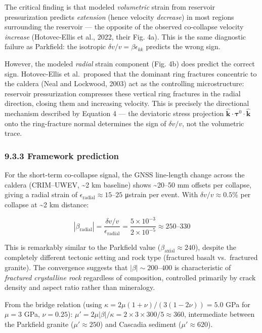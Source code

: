 \documentclass[12pt]{article}
\begin{document}
The critical finding is that modeled \emph{volumetric} strain from
reservoir pressurization predicts \emph{extension} (hence velocity
\emph{decrease}) in most regions surrounding the reservoir --- the
opposite of the observed co-collapse velocity \emph{increase}
(Hotovec-Ellis et al., 2022, their Fig. 4a). This is the same diagnostic
failure as Parkfield: the isotropic \(\delta v/v = \beta\epsilon_{kk}\)
predicts the wrong sign.

However, the modeled \emph{radial} strain component (Fig. 4b) does
predict the correct sign. Hotovec-Ellis et al.~proposed that the
dominant ring fractures concentric to the caldera (Neal and Lockwood,
2003) act as the controlling microstructure: reservoir pressurization
compresses these vertical ring fractures in the radial direction,
closing them and increasing velocity. This is precisely the directional
mechanism described by Equation 4 --- the deviatoric stress projection
\(\hat{\mathbf{k}} \cdot \boldsymbol{\tau}^0 \cdot \hat{\mathbf{k}}\)
onto the ring-fracture normal determines the sign of \(\delta v/v\), not
the volumetric trace.

\subsubsection{9.3.3 Framework prediction}\label{framework-prediction-1}

For the short-term co-collapse signal, the GNSS line-length change
across the caldera (CRIM--UWEV, \textasciitilde2 km baseline) shows
\textasciitilde20--50 mm offsets per collapse, giving a radial strain of
\(\epsilon_{\text{radial}} \approx 15\)--\(25\) μstrain per event. With
\(\delta v/v \approx 0.5\%\) per collapse at \textasciitilde2 km
distance:

\[|\beta_{\text{radial}}| = \frac{\delta v/v}{\epsilon_{\text{radial}}} = \frac{5 \times 10^{-3}}{2 \times 10^{-5}} \approx 250\text{–}330\]

This is remarkably similar to the Parkfield value
(\(\beta_{\text{axial}} \approx 240\)), despite the completely different
tectonic setting and rock type (fractured basalt vs.~fractured granite).
The convergence suggests that \(|\beta| \sim 200\)--\(400\) is
characteristic of \emph{fractured crystalline rock} regardless of
composition, controlled primarily by crack density and aspect ratio
rather than mineralogy.

From the bridge relation (using
\(\kappa = 2\mu(1+\nu)/(3(1-2\nu)) = 5.0\) GPa for \(\mu = 3\) GPa,
\(\nu = 0.25\)):
\(\mu' = 2\mu|\beta|/\kappa = 2 \times 3 \times 300 / 5 \approx 360\),
intermediate between the Parkfield granite (\(\mu' \approx 250\)) and
Cascadia sediment (\(\mu' \approx 620\)).
\end{document}
